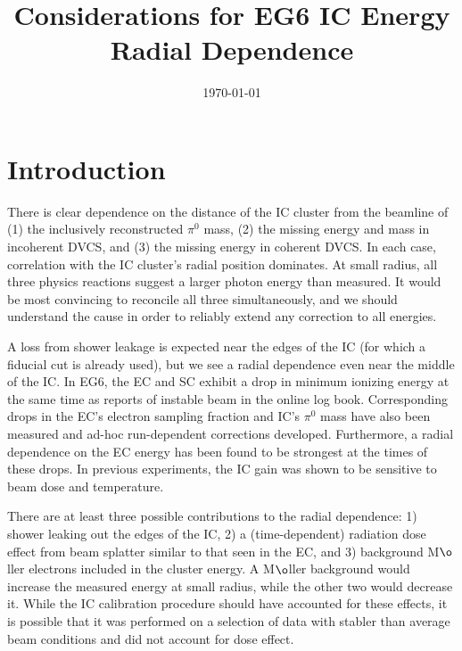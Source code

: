 \documentclass[amsmath,amssymb,notitlepage,11pt]{revtex4-1}
\begin{document}
\hspace*{11.5cm}

\title{Considerations for EG6 IC Energy Radial Dependence}
\date{\today}
\maketitle
\section{Introduction}
There is clear dependence on the distance of the IC cluster from the beamline of (1) the inclusively reconstructed $\pi^0$ mass, (2) the missing energy and mass in incoherent DVCS, and (3) the missing energy in coherent DVCS.  In each case, correlation with the IC cluster's radial position dominates.  At small radius, all three physics reactions suggest a larger photon energy than measured.  It would be most convincing to reconcile all three simultaneously, and we should understand the cause in order to reliably extend any correction to all energies. 

A loss from shower leakage is expected near the edges of the IC (for which a fiducial cut is already used), but we see a radial dependence even near the middle of the IC.
In EG6, the EC and SC exhibit a drop in minimum ionizing energy at the same time as reports of instable beam in the online log book.  Corresponding drops in the EC's electron sampling fraction and IC's $\pi^0$ mass have also been measured and ad-hoc run-dependent corrections developed.  Furthermore, a radial dependence on the EC energy has been found to be strongest at the times of these drops.  In previous experiments, the IC gain was shown to be sensitive to beam dose and temperature.

There are at least three possible contributions to the radial dependence: 1) shower leaking out the edges of the IC, 2) a (time-dependent) radiation dose effect from beam splatter similar to that seen in the EC, and 3) background M$\o$ller electrons included in the cluster energy.  A M$\o$ller background would increase the measured energy at small radius, while the other two would decrease it.  While the IC calibration procedure should have accounted for these effects, it is possible that it was performed on a selection of data with stabler than average beam conditions and did not account for dose effect.
\end{document}
